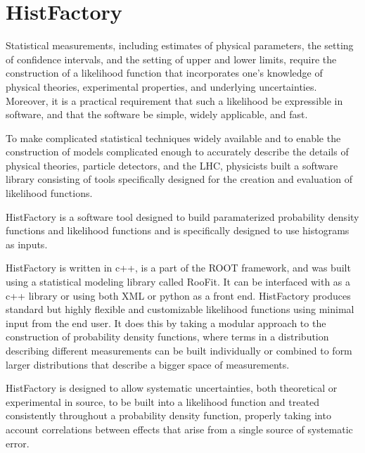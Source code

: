 

\section{HistFactory}
\label{app:histfactory}

Statistical measurements, including estimates of physical parameters, the setting of confidence intervals, and the setting of upper and lower limits, require the construction of a likelihood function that incorporates one's knowledge of physical theories, experimental properties, and underlying uncertainties.
Moreover, it is a practical requirement that such a likelihood be expressible in software, and that the software be simple, widely applicable, and fast.

To make complicated statistical techniques widely available and to enable the construction of models complicated enough to accurately describe the details of physical theories, particle detectors, and the LHC, physicists built a software library consisting of tools specifically designed for the creation and evaluation of likelihood functions.

HistFactory is a software tool designed to build paramaterized probability density functions and likelihood functions and is specifically designed to use histograms as inputs.

HistFactory is written in c++, is a part of the ROOT framework, and was built using a statistical modeling library called RooFit.
It can be interfaced with as a c++ library or using both XML or python as a front end.
HistFactory produces standard but highly flexible and customizable likelihood functions using minimal input from the end user.
It does this by taking a modular approach to the construction of probability density functions, where terms in a distribution describing different measurements can be built individually or combined to form larger distributions that describe a bigger space of measurements.

HistFactory is designed to allow systematic uncertainties, both theoretical or experimental in source, to be built into a likelihood function and treated consistently throughout a probability density function, properly taking into account correlations between effects that arise from a single source of systematic error.



